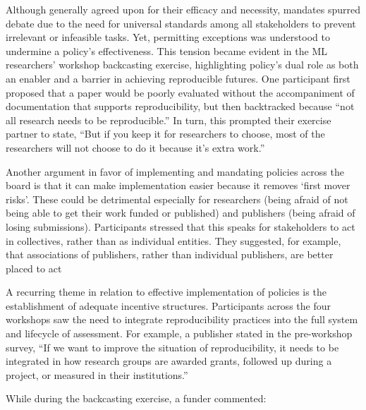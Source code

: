 \documentclass[authordate, meta]{jote-new-article}
\begin{document}
	Although generally agreed upon for their efficacy and necessity, mandates spurred debate due to the need for universal standards among all stakeholders to prevent irrelevant or infeasible tasks. Yet, permitting exceptions was understood to undermine a policy's effectiveness. This tension became evident in the ML researchers' workshop backcasting exercise, highlighting policy's dual role as both an enabler and a barrier in achieving reproducible futures. One participant first proposed that a paper would be poorly evaluated without the accompaniment of documentation that supports reproducibility, but then backtracked because “not all research needs to be reproducible.” In turn, this prompted their exercise partner to state, “But if you keep it for researchers to choose, most of the researchers will not choose to do it because it's extra work.”  







	Another argument in favor of implementing and mandating policies across the board is that it can make implementation easier because it removes ‘first mover risks'. These could be detrimental especially for researchers (being afraid of not being able to get their work funded or published) and publishers (being afraid of losing submissions). Participants stressed that this speaks for stakeholders to act in collectives, rather than as individual entities. They suggested, for example, that associations of publishers, rather than individual publishers, are better placed to act



	A recurring theme in relation to effective implementation of policies is the establishment of adequate incentive structures. Participants across the four workshops saw the need to integrate reproducibility practices into the full system and lifecycle of assessment. For example, a publisher stated in the pre-workshop survey, “If we want to improve the situation of reproducibility, it needs to be integrated in how research groups are awarded grants, followed up during a project, or measured in their institutions.”







	While during the backcasting exercise, a funder commented:
\end{document}
